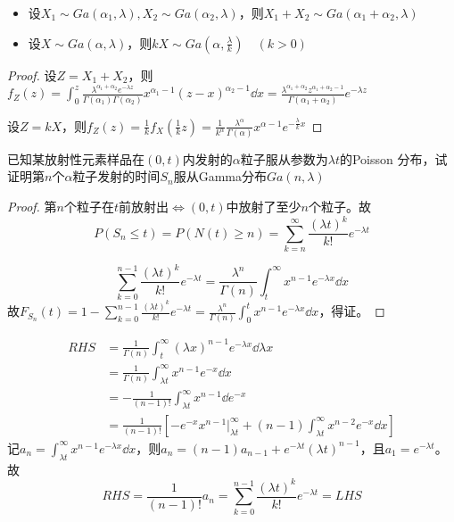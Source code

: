 \documentclass[UTF-8]{ctexbeamer}
\begin{document}
\begin{frame}
  \begin{Prop}[Gamma分布之性质]
    \begin{itemize}
    \item 设$X_{1}\sim Ga(\alpha_{1},\lambda),X_{2}\sim Ga(\alpha_{2},\lambda)$，则$X_{1}+X_{2}\sim Ga(\alpha_{1}+\alpha_{2},\lambda)$
    \item 设$X\sim Ga(\alpha,\lambda)$，则$kX\sim Ga(\alpha,\frac{\lambda}{k})\quad (k>0)$
    
    \end{itemize}
  \end{Prop}%
  \begin{proof}
    设$Z=X_{1}+X_{2}$，则$f_{Z}(z)=\int_{0}^{z}\frac{\lambda^{\alpha_{1}+\alpha_{2}}e^{-\lambda z}}{\Gamma(\alpha_{1})\Gamma(\alpha_{2})}x^{\alpha_{1}-1}(z-x)^{\alpha_{2}-1}\dd x=\frac{\lambda^{\alpha_{1}+\alpha_{2}}z^{\alpha_{1}+\alpha_{2}-1}}{\Gamma(\alpha_{1}+\alpha_{2})}e^{-\lambda z}$

    设$Z=kX$，则$f_{Z}(z)=\frac{1}{k}f_{X}(\frac{1}{k}z)=\frac{1}{k^{\alpha}}\frac{\lambda^{\alpha}}{\Gamma(\alpha)}x^{\alpha-1}e^{-\frac{\lambda}{k}x}$
  \end{proof}
\end{frame}

\begin{frame}
  \begin{Eg}
    已知某放射性元素样品在$(0,t)$内发射的$\alpha$粒子服从参数为$\lambda t$的Poisson 分布，试证明第$n$个$\alpha$粒子发射的时间$S_{n}$服从Gamma分布$Ga(n,\lambda)$
  \end{Eg}
  \begin{proof}
    第$n$个粒子在$t$前放射出$\Leftrightarrow (0,t)$中放射了至少$n$个粒子。故
    \[P(S_{n}\leq t)=P(N(t)\geq n)=\sum_{k=n}^{\infty}\frac{(\lambda t)^{k}}{k!}e^{-\lambda t}\]

    \[\sum_{k=0}^{n-1}\frac{(\lambda t)^{k}}{k!}e^{-\lambda t}=\frac{\lambda^{n}}{\Gamma(n)}\int_{t}^{\infty}x^{n-1}e^{-\lambda x}\dd x\]
    故$F_{S_{n}}(t)=1-\sum_{k=0}^{n-1}\frac{(\lambda t)^{k}}{k!}e^{-\lambda t}=\frac{\lambda^{n}}{\Gamma(n)}\int_{0}^{t}x^{n-1}e^{-\lambda x}\dd x$，得证。
  \end{proof}
\end{frame}

\begin{frame}
  
\begin{align*}
RHS&=\frac{1}{\Gamma(n)}\int_t^\infty(\lambda x)^{n-1}e^{-\lambda x}\dd\lambda x\\
&=\frac{1}{\Gamma(n)}\int_{\lambda t}^\infty x^{n-1}e^{-x}\dd x\\
&=-\frac{1}{(n-1)!}\int_{\lambda t}^\infty x^{n-1}\dd e^{-x}\\
&=\frac{1}{(n-1)!}[-e^{-x}x^{n-1}|_{\lambda t}^\infty +(n-1)\int_{\lambda t}^\infty x^{n-2}e^{-x}\dd x]
\end{align*}
记$a_n=\int_{\lambda t}^\infty x^{n-1}e^{-\lambda x}\dd x$，则$a_n=(n-1)a_{n-1}+e^{-\lambda t}(\lambda t)^{n-1}$，且$a_1=e^{-\lambda t}$。故
\[RHS=\frac{1}{(n-1)!}a_n=\sum_{k=0}^{n-1}\frac{(\lambda t)^{k}}{k!}e^{-\lambda t}=LHS\]
\end{frame}
\end{document}
